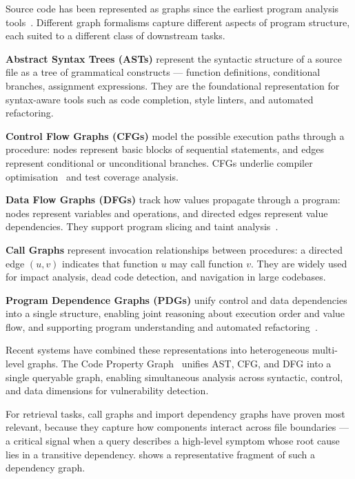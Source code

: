Source code has been represented as graphs since the earliest program analysis
tools~\cite{compilers}.
Different graph formalisms capture different aspects of program structure, each suited to
a different class of downstream tasks.

\textbf{Abstract Syntax Trees (ASTs)} represent the syntactic structure of a source file
as a tree of grammatical constructs — function definitions, conditional branches,
assignment expressions.
They are the foundational representation for syntax-aware tools such as code completion,
style linters, and automated refactoring.

\textbf{Control Flow Graphs (CFGs)} model the possible execution paths through a
procedure: nodes represent basic blocks of sequential statements, and edges represent
conditional or unconditional branches.
CFGs underlie compiler optimisation~\cite{compilers} and test coverage analysis.

\textbf{Data Flow Graphs (DFGs)} track how values propagate through a program:
nodes represent variables and operations, and directed edges represent value
dependencies.
They support program slicing and taint analysis~\cite{weiser1984slicing}.

\textbf{Call Graphs} represent invocation relationships between procedures: a directed
edge $(u, v)$ indicates that function $u$ may call function $v$.
They are widely used for impact analysis, dead code detection, and navigation in large
codebases.

\textbf{Program Dependence Graphs (PDGs)} unify control and data dependencies into a
single structure, enabling joint reasoning about execution order and value flow, and
supporting program understanding and automated refactoring~\cite{ferrante1987pdg}.

Recent systems have combined these representations into heterogeneous multi-level graphs.
The Code Property Graph~\cite{yamaguchi2014cpg} unifies AST, CFG, and DFG into a single
queryable graph, enabling simultaneous analysis across syntactic, control, and data
dimensions for vulnerability detection.

For retrieval tasks, call graphs and import dependency graphs have proven most relevant,
because they capture how components interact across file boundaries — a critical signal
when a query describes a high-level symptom whose root cause lies in a transitive
dependency.
 shows a representative fragment of such a dependency graph.

